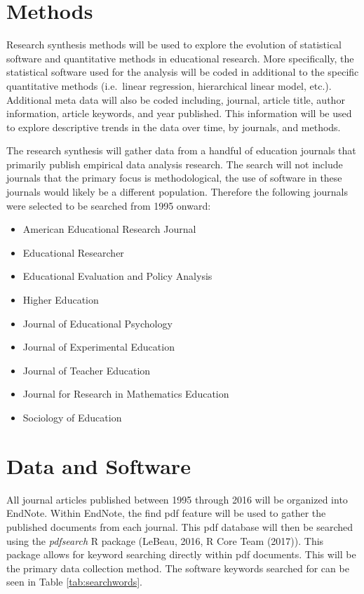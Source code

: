 \documentclass[english,floatsintext,man]{apa6}
\providecommand{\tightlist}{%
  \setlength{\itemsep}{0pt}\setlength{\parskip}{0pt}}
\newcounter{author}
\theoremstyle{definition}
\theoremstyle{definition}
\theoremstyle{remark}
\begin{document}
\section{Methods}\label{methods}

Research synthesis methods will be used to explore the evolution of
statistical software and quantitative methods in educational research.
More specifically, the statistical software used for the analysis will
be coded in additional to the specific quantitative methods (i.e.~linear
regression, hierarchical linear model, etc.). Additional meta data will
also be coded including, journal, article title, author information,
article keywords, and year published. This information will be used to
explore descriptive trends in the data over time, by journals, and
methods.

The research synthesis will gather data from a handful of education
journals that primarily publish empirical data analysis research. The
search will not include journals that the primary focus is
methodological, the use of software in these journals would likely be a
different population. Therefore the following journals were selected to
be searched from 1995 onward:

\begin{itemize}
\tightlist
\item
  American Educational Research Journal
\item
  Educational Researcher
\item
  Educational Evaluation and Policy Analysis
\item
  Higher Education
\item
  Journal of Educational Psychology
\item
  Journal of Experimental Education
\item
  Journal of Teacher Education
\item
  Journal for Research in Mathematics Education
\item
  Sociology of Education
\end{itemize}

\section{Data and Software}\label{data-and-software}

All journal articles published between 1995 through 2016 will be
organized into EndNote. Within EndNote, the find pdf feature will be
used to gather the published documents from each journal. This pdf
database will then be searched using the \emph{pdfsearch} R package
(LeBeau, 2016, R Core Team (2017)). This package allows for keyword
searching directly within pdf documents. This will be the primary data
collection method. The software keywords searched for can be seen in
Table \ref{tab:searchwords}.
\end{document}
